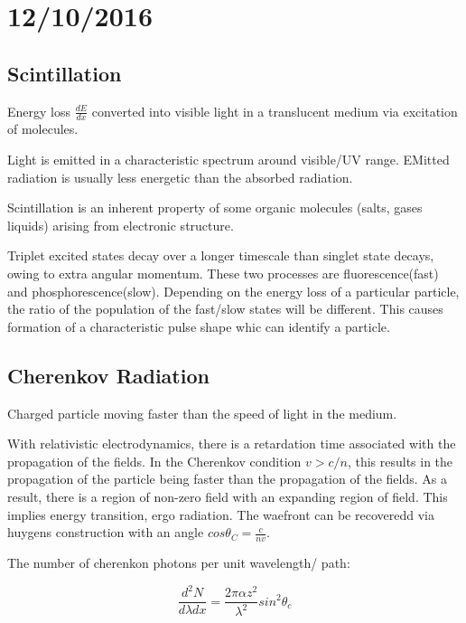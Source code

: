 \documentclass[]{article}
\begin{document}
	
\section{12/10/2016}

	\subsection{Scintillation}
	
	
		Energy loss $\frac{dE}{dx}$ converted into visible light in a translucent medium via excitation of molecules.
		
		Light is emitted in a characteristic spectrum around visible/UV range. EMitted radiation is usually less energetic than the absorbed radiation.
		
		Scintillation is an inherent property of some organic molecules (salts, gases liquids) arising from electronic structure.
		
		Triplet excited states decay over a longer timescale than singlet state decays, owing to extra angular momentum. These two processes are fluorescence(fast) and phosphorescence(slow). Depending on the energy loss of a particular particle, the ratio of the population of the fast/slow states will be different. This causes formation of a characteristic pulse shape whic can identify a particle.
		
	\subsection{Cherenkov Radiation}
	
	Charged particle moving faster than the speed of light in the medium.
	
	With relativistic electrodynamics, there is a retardation time associated with the propagation of the fields. In the Cherenkov condition $v > c/n$, this results in the propagation of the particle being faster than the propagation of the fields. As a result, there is a region of non-zero field with an expanding region of field. This implies energy transition, ergo radiation. The waefront can be recoveredd via huygens construction with an angle $cos\theta_C=\frac{c}{nv}$.
	
	The number of cherenkon photons per unit wavelength/ path:
	
	\begin{equation}
		\frac{d^2N}{d\lambda dx} = \frac{2\pi\alpha z^2}{\lambda^2}sin^2\theta_c
	\end{equation}
	
\end{document}
